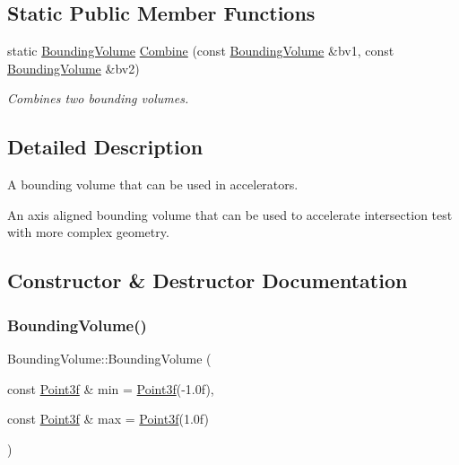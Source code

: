 \subsection*{Static Public Member Functions}
\begin{DoxyCompactItemize}
\item 
static \mbox{\hyperlink{class_bounding_volume}{Bounding\+Volume}} \mbox{\hyperlink{class_bounding_volume_afbe70324973e3ae457ed83d332e57581}{Combine}} (const \mbox{\hyperlink{class_bounding_volume}{Bounding\+Volume}} \&bv1, const \mbox{\hyperlink{class_bounding_volume}{Bounding\+Volume}} \&bv2)
\begin{DoxyCompactList}\small\item\em Combines two bounding volumes. \end{DoxyCompactList}\end{DoxyCompactItemize}


\subsection{Detailed Description}
A bounding volume that can be used in accelerators. 

An axis aligned bounding volume that can be used to accelerate intersection test with more complex geometry. 

\subsection{Constructor \& Destructor Documentation}
\mbox{\label{class_bounding_volume_a08c918227002a6c6d08548a8e9e02cd7}} 
\subsubsection{\texorpdfstring{BoundingVolume()}{BoundingVolume()}}
{\footnotesize\ttfamily Bounding\+Volume\+::\+Bounding\+Volume (\begin{DoxyParamCaption}\item[{const \mbox{\hyperlink{class_point}{Point3f}} \&}]{min = {\ttfamily \mbox{\hyperlink{class_point}{Point3f}}(-\/1.0f)},  }\item[{const \mbox{\hyperlink{class_point}{Point3f}} \&}]{max = {\ttfamily \mbox{\hyperlink{class_point}{Point3f}}(1.0f)} }\end{DoxyParamCaption})\hspace{0.3cm}{\ttfamily [inline]}}



